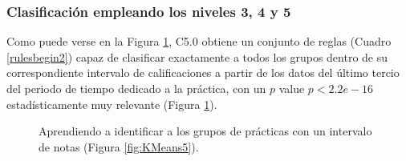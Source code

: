 \subsubsection{Clasificación empleando los niveles 3, 4 y 5}

Como puede verse en la Figura \ref{fig:cmbegin2}, C5.0 obtiene un conjunto de reglas (Cuadro \ref{rulesbegin2}) capaz de clasificar exactamente a todos los grupos dentro de su correspondiente intervalo de calificaciones a partir de los datos del último tercio del periodo de tiempo dedicado a la práctica, con un $p$ value $p < 2.2e-16$ estadísticamente muy relevante (Figura \ref{fig:cmbegin2}).

\begin{figure}[H]
\centering
{}
\caption{Aprendiendo a identificar a los grupos de prácticas con un intervalo de notas (Figura \ref{fig:KMeans5}).}
\label{fig:cmbegin2}
\end{figure}

